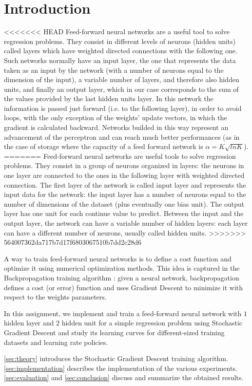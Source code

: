 \section{Introduction}
\label{sec:introduction}

<<<<<<< HEAD
Feed-forward neural networks are a useful tool to solve regression problems.
They consist in different levels of neurons (hidden units) called layers which have weighted directed connections with the following one.
Such networks normally have an input layer, the one that represents the data taken as an input by the network (with a number of neurons equal
to the dimension of the input), a variable number of layers, and therefore also hidden units, and finally an output layer, which in our case
corresponds to the sum of the values provided by the last hidden units layer. In this network the information is passed
just forward (i.e. to the following layer), in order to avoid loops, with the only exception of the  weights' update vectors, in which the gradient is calculated backward.
Networks builded in this way represent an advancement of the perceptron and can reach much better performances (as in the case of storage where the capacity of a feed forward network is $\alpha = K \sqrt{ln K}$).
=======
Feed-forward neural networks are useful tools to solve regression problems.
They consist in a group of neurons organized in layers:
the neurons in one layer are connected to the ones in the following layer with weighted directed connection.
The first layer of the network is called input layer and represents the input data for the network:
the input layer has a number of neurons equal to the number of dimensions of the dataset (plus eventually one bias unit).
The output layer has one unit for each continue value to predict.
Between the input and the output layer, the network can have a variable number of hidden layers:
each layer can have a different number of neurons, usually called hidden units.
>>>>>>> 564007362da717b7d17f6803067510b7dd2c28d6

A way to train feed-forward neural networks is to define a cost function and optimize it using numerical optimization methods.
This idea is captured in the Backpropagation training algorithm \cite{chauvin1995backpropagation}:
given a neural network, backpropagation defines a cost (or error) function and uses Gradient Descent to minimize it with respect to the weights parameters.

In this assignment, we implement and train a feed-forward neural network with $1$ hidden layer and $2$ hidden unit for a simple regression problem using Stochastic Gradient Descent and study its learning curves for different-sized training datasets and learning rate policies.

\cref{sec:theory} introduces the Stochastic Gradient Descent training algorithm.
\cref{sec:implementation} describes the implementation of the various experiments.
\cref{sec:evaluation} and \cref{sec:conclusion} discuss and summarize the obtained results.
